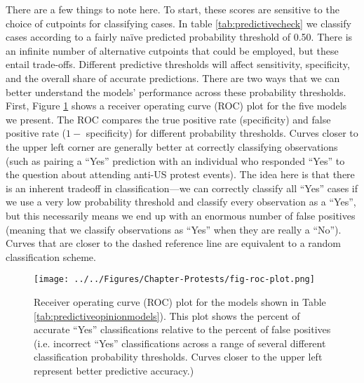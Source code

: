 			There are a few things to note here. To start, these scores are sensitive to the choice of cutpoints for classifying cases. In table \ref{tab:predictivecheck} we classify cases according to a fairly na\"{i}ve predicted probability threshold of 0.50. There is an infinite number of alternative cutpoints that could be employed, but these entail trade-offs. Different predictive thresholds will affect sensitivity, specificity, and the overall share of accurate predictions. There are two ways that we can better understand the models' performance across these probability thresholds. First, Figure \ref{fig:protest-roc-plot} shows a receiver operating curve (ROC) plot for the five models we present. The ROC compares the true positive rate (specificity) and false positive rate ($1-$ specificity) for different probability thresholds. Curves closer to the upper left corner are generally better at correctly classifying observations (such as pairing a ``Yes'' prediction with an individual who responded ``Yes'' to the question about attending anti-US protest events). The idea here is that there is an inherent tradeoff in classification---we can correctly classify all ``Yes'' cases if we use a very low probability threshold and classify every observation as a ``Yes'', but this necessarily means we end up with an enormous number of false positives (meaning that we classify observations as ``Yes'' when they are really a ``No''). Curves that are closer to the dashed reference line are equivalent to a random classification scheme.
			
			
			\begin{figure}[t]
				\centering\texttt{[image: ../../Figures/Chapter-Protests/fig-roc-plot.png]}
				\caption{Receiver operating curve (ROC) plot for the models shown in Table \ref{tab:predictiveopinionmodels}). This plot shows the percent of accurate ``Yes'' classifications relative to the percent of false positives (i.e. incorrect ``Yes'' classifications across a range of several different classification probability thresholds. Curves closer to the upper left represent better predictive accuracy.)}
				\label{fig:protest-roc-plot}
			\end{figure}
			
